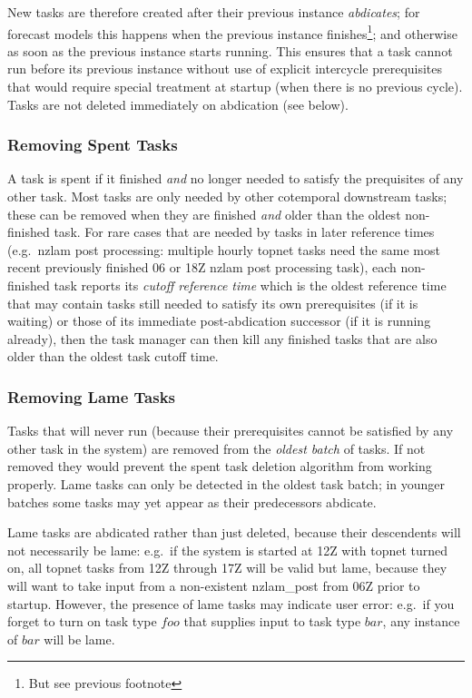 New tasks are therefore created after their previous instance {\em
abdicates}; for forecast models this happens when the previous instance
finishes\footnote{But see previous footnote}; and otherwise as soon as
the previous instance starts running. This ensures that a task cannot
run before its previous instance without use of explicit intercycle
prerequisites that would require special treatment at startup (when
there is no previous cycle). Tasks are not deleted immediately on
abdication (see below).

\subsubsection{Removing Spent Tasks} 

A task is spent if it finished {\em and} no longer needed to satisfy the
prequisites of any other task. Most tasks are only needed by other
cotemporal downstream tasks; these can be removed when they are finished
{\em and} older than the oldest non-finished task. For rare cases that
are needed by tasks in later reference times (e.g.\ nzlam post
processing: multiple hourly topnet tasks need the same most recent
previously finished 06 or 18Z nzlam post processing task), each
non-finished task reports its {\em cutoff reference time} which is the
oldest reference time that may contain tasks still needed to satisfy its
own prerequisites (if it is waiting) or those of its immediate
post-abdication successor (if it is running already), then the task
manager can then kill any finished tasks that are also older than the
oldest task cutoff time.

\subsubsection{Removing Lame Tasks} 

Tasks that will never run (because their prerequisites cannot be
satisfied by any other task in the system) are removed from the {\em
oldest batch} of tasks.  If not removed they would prevent the spent
task deletion algorithm from working properly. Lame tasks can only be
detected in the oldest task batch; in younger batches some tasks may yet
appear as their predecessors abdicate.

Lame tasks are abdicated rather than just deleted, because their
descendents will not necessarily be lame: e.g.\ if the system is started
at 12Z with topnet turned on, all topnet tasks from 12Z through 17Z will
be valid but lame, because they will want to take input from a
non-existent nzlam\_post from 06Z prior to startup. However, the
presence of lame tasks may indicate user error: e.g.\ if you forget
to turn on task type $foo$ that supplies input to task type $bar$,
any instance of $bar$ will be lame.

